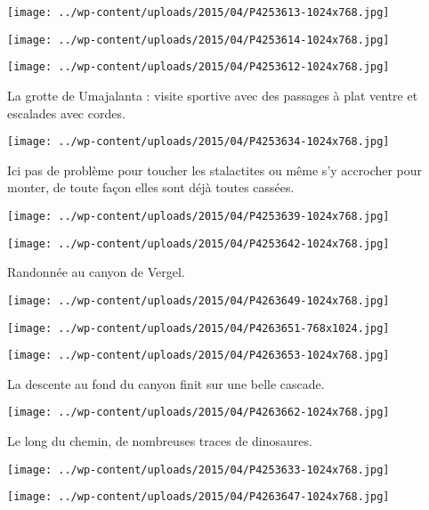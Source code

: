 \centerline{\texttt{[image: ../wp-content/uploads/2015/04/P4253613-1024x768.jpg]} } 
 \newline
 \newline
\centerline{\texttt{[image: ../wp-content/uploads/2015/04/P4253614-1024x768.jpg]} } 
 \newline
 \newline
\centerline{\texttt{[image: ../wp-content/uploads/2015/04/P4253612-1024x768.jpg]} } 
 \newline
 La grotte de Umajalanta : visite sportive avec des passages à plat ventre et escalades avec cordes. \newline
 \newline
\centerline{\texttt{[image: ../wp-content/uploads/2015/04/P4253634-1024x768.jpg]} } 
 \newline
 Ici pas de problème pour toucher les stalactites ou même s'y accrocher pour monter, de toute façon elles sont déjà toutes cassées. \newline
 \newline
\centerline{\texttt{[image: ../wp-content/uploads/2015/04/P4253639-1024x768.jpg]} } 
 \newline
 \newline
\centerline{\texttt{[image: ../wp-content/uploads/2015/04/P4253642-1024x768.jpg]} } 
 \newline
 Randonnée au canyon de Vergel. \newline
 \newline
\centerline{\texttt{[image: ../wp-content/uploads/2015/04/P4263649-1024x768.jpg]} } 
 \newline
 \newline
\centerline{\texttt{[image: ../wp-content/uploads/2015/04/P4263651-768x1024.jpg]} } 
 \newline
 \newline
\centerline{\texttt{[image: ../wp-content/uploads/2015/04/P4263653-1024x768.jpg]} } 
 \newline
 La descente au fond du canyon finit sur une belle cascade. \newline
 \newline
\centerline{\texttt{[image: ../wp-content/uploads/2015/04/P4263662-1024x768.jpg]} } 
 \newline
 Le long du chemin, de nombreuses traces de dinosaures. \newline
 \newline
\centerline{\texttt{[image: ../wp-content/uploads/2015/04/P4253633-1024x768.jpg]} } 
 \newline
 \newline
\centerline{\texttt{[image: ../wp-content/uploads/2015/04/P4263647-1024x768.jpg]} } 
 \newline

\newpage
 
